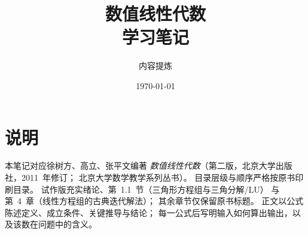 \documentclass[UTF8,zihao=-4,openany]{ctexbook}
\title{\heiti 数值线性代数\\[0.4em]\Large 学习笔记}
\author{内容提炼}
\date{\today}
\begin{document}
\maketitle
\frontmatter

\chapter*{说明}
本笔记对应徐树方、高立、张平文编著
\emph{数值线性代数}（第二版，北京大学出版社，2011~年修订；
北京大学数学教学系列丛书）。
目录层级与顺序严格按原书印刷目录。
试作版充实绪论、第~1.1~节（三角形方程组与三角分解/LU）
与第~4~章（线性方程组的古典迭代解法）；
其余章节仅保留原书标题。
正文以公式陈述定义、成立条件、关键推导与结论；
每一公式后写明输入如何算出输出，以及该数在问题中的含义。

\hypertarget{contents}{}
\tableofcontents

\mainmatter








\end{document}
